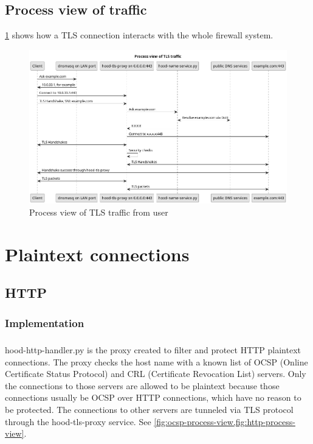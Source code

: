\documentclass[mscthesis]{usiinfthesis}
\begin{document}
\section{Process view of traffic}
\cref{fig:tls-process-view} shows how a TLS connection interacts with the whole firewall system.
\begin{figure}[H]
  \includegraphics[width=\textheight, angle=90]{graphics/puml/process-tls-traffic.png}
  \caption{Process view of TLS traffic from user}
  \label{fig:tls-process-view}
\end{figure}

\chapter{Plaintext connections}

\section{HTTP}
\subsection{Implementation}
\paragraph{}
hood-http-handler.py is the proxy created to filter and protect HTTP plaintext connections. The proxy checks the host name with a known list of OCSP (Online Certificate Status Protocol) and CRL (Certificate Revocation List) servers. Only the connections to those servers are allowed to be plaintext because those connections usually be OCSP over HTTP connections, which have no reason to be protected. The connections to other servers are tunneled via TLS protocol through the hood-tls-proxy service. See \cref{fig:ocsp-process-view,fig:http-process-view}.
\end{document}
